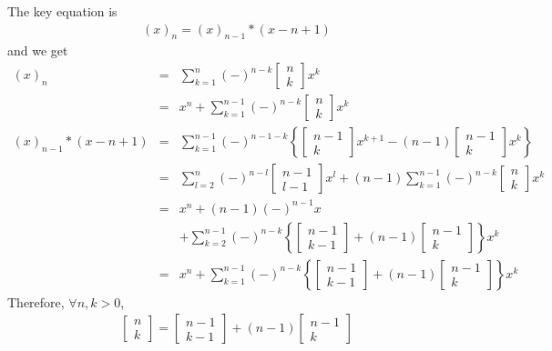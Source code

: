 \documentclass[11pt]{book}
\begin{document}
The key equation is
\begin{eqnarray}
(x)_n = (x)_{n-1}*  (x-n+1)
\end{eqnarray}
and we get
\begin{eqnarray}
(x)_n &=& \sum_{k=1}^n (-)^{n-k} \left[\begin{array}{c}n \\k \end{array}\right] x^k\\
&=& x^n + \sum_{k=1}^{n-1} (-)^{n-k} \left[\begin{array}{c}n \\k \end{array}\right] x^k\\
(x)_{n-1}*  (x-n+1) &=&  \sum_{k=1}^{n-1} (-)^{n-1-k} \left\{ \left[\begin{array}{c}n-1 \\k \end{array}\right] x^{k+1} -(n-1) \left[\begin{array}{c}n-1 \\k \end{array}\right] x^k \right\} \qquad \qquad \\
&=& \sum_{l=2}^n (-)^{n-l} \left[\begin{array}{c}n-1 \\l-1 \end{array}\right] x^l + (n-1)\sum_{k=1}^{n-1} (-)^{n-k} \left[\begin{array}{c}n \\k \end{array}\right] x^k \\
\nonumber &=& x^n + (n-1)(-)^{n-1} x \\
&&+ \sum_{k=2}^{n-1} (-)^{n-k} \left\{ \left[\begin{array}{c}n-1 \\k-1 \end{array}\right]  + (n-1)  \left[\begin{array}{c}n-1 \\k \end{array}\right] \right\} x^k \\
&=& x^n + \sum_{k=1}^{n-1} (-)^{n-k} \left\{ \left[\begin{array}{c}n-1 \\k-1 \end{array}\right]  + (n-1)  \left[\begin{array}{c}n-1 \\k \end{array}\right] \right\} x^k 
\end{eqnarray}
Therefore, $\forall n,k > 0$,
\begin{eqnarray}
\left[\begin{array}{c}n \\k \end{array}\right] = \left[\begin{array}{c}n-1 \\k-1 \end{array}\right]  + (n-1)  \left[\begin{array}{c}n-1 \\k \end{array}\right]
\end{eqnarray}
\end{document}
